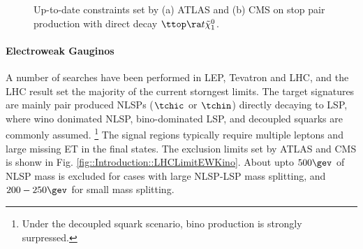 \begin{figure}[h]
  \centering
    \caption{Up-to-date constraints set by (a) ATLAS and (b) CMS on stop pair production with direct decay $\ttop \ra t \tilde{\chi}_1^0$.}
    \label{fig::Introduction::LHCLimitStop}
\end{figure}



\paragraph{Electroweak Gauginos}
A number of searches have been performed in LEP, Tevatron and LHC, and the LHC result set the majority of the current storngest limits. The target signatures are mainly pair produced NLSPs ($\tchic$ or $\tchin$) directly decaying to LSP, where wino donimated NLSP, bino-dominated LSP, and decoupled squarks are commonly assumed.
\footnote{Under the decoupled squark scenario, bino production is strongly surpressed.}
The signal regions typically require multiple leptons and large missing ET in the final states.
The exclusion limits set by ATLAS and CMS is shonw in Fig. \ref{fig::Introduction::LHCLimitEWKino}.
About upto $500\gev$ of NLSP mass is excluded for cases with large NLSP-LSP mass splitting, and $200-250\gev$ for small mass splitting.  \\


